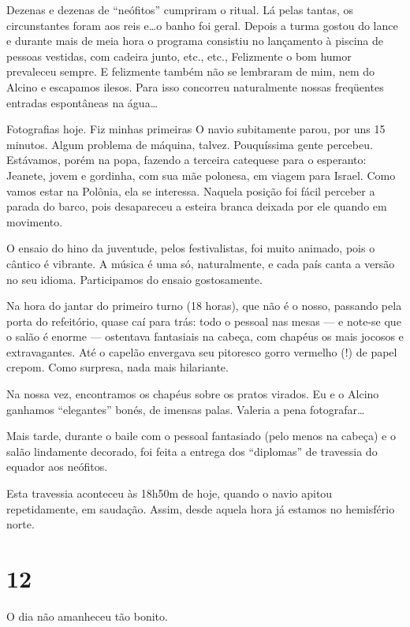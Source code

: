 Dezenas e dezenas de ``neófitos'' cumpriram o ritual. Lá pelas tantas, os circunstantes foram aos reis e\ldots o banho foi geral. Depois a turma gostou do lance e durante mais de meia hora o programa consistiu no lançamento à piscina de pessoas vestidas, com cadeira junto, etc., etc., Felizmente o bom humor prevaleceu sempre. E felizmente também não se lembraram de mim, nem do Alcino e escapamos ilesos. Para isso concorreu naturalmente nossas freqüentes entradas espontâneas na água\ldots

Fotografias hoje. Fiz minhas primeiras O navio subitamente parou, por uns 15 minutos. Algum problema de máquina, talvez. Pouquíssima gente percebeu. Estávamos, porém na popa, fazendo a terceira catequese para o esperanto: Jeanete, jovem e gordinha, com sua mãe polonesa, em viagem para Israel. Como vamos estar na Polônia, ela se interessa. Naquela posição foi fácil perceber a parada do barco, pois desapareceu a esteira branca deixada por ele quando em movimento.

O ensaio do hino da juventude, pelos festivalistas, foi muito animado, pois o cântico é vibrante. A música é uma só, naturalmente, e cada país canta a versão no seu idioma. Participamos do ensaio gostosamente.

Na hora do jantar do primeiro turno (18 horas), que não é o nosso, passando pela porta do refeitório, quase caí para trás: todo o pessoal nas mesas --- e note-se que o salão é enorme --- ostentava fantasiais na cabeça, com chapéus os mais jocosos e extravagantes. Até o capelão envergava seu pitoresco gorro vermelho (!) de papel crepom. Como surpresa, nada mais hilariante.

Na nossa vez, encontramos os chapéus sobre os pratos virados. Eu e o Alcino ganhamos ``elegantes'' bonés, de imensas palas. Valeria a pena fotografar\ldots

Mais tarde, durante o baile com o pessoal fantasiado (pelo menos na cabeça) e o salão lindamente decorado, foi feita a entrega dos ``diplomas'' de travessia do equador aos neófitos.

Esta travessia aconteceu às 18h50m de hoje, quando o navio apitou repetidamente, em saudação. Assim, desde aquela hora já estamos no hemisfério norte.

\section*{12 \adfflatleafright {}}

O dia não amanheceu tão bonito.

